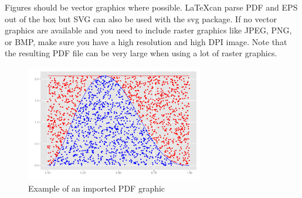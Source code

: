 Figures should be vector graphics where possible. \LaTeX can parse PDF and EPS out of the box but SVG can also be used with the svg package. If no vector graphics are available and you need to include raster graphics like JPEG, PNG, or BMP, make sure you have a high resolution and high DPI image. Note that the resulting PDF file can be very large when using a lot of raster graphics.


\begin{figure}[ht]
	\centering
	\includegraphics[height=5.1cm]{graphics/demo-graphic.pdf}
	\caption{Example of an imported PDF graphic}
	\label{figure:1}
\end{figure}




